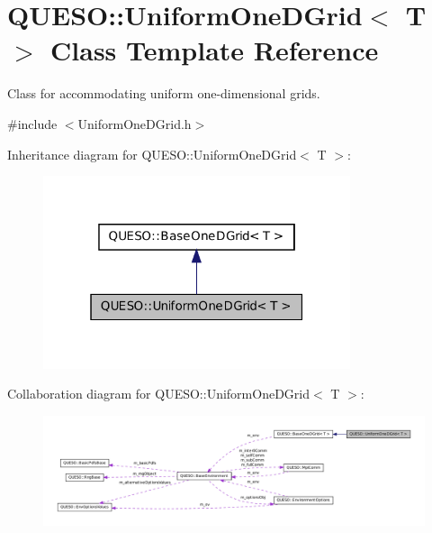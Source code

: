 \hypertarget{class_q_u_e_s_o_1_1_uniform_one_d_grid}{\section{Q\-U\-E\-S\-O\-:\-:Uniform\-One\-D\-Grid$<$ T $>$ Class Template Reference}
\label{class_q_u_e_s_o_1_1_uniform_one_d_grid}
}


Class for accommodating uniform one-\/dimensional grids.  




{\ttfamily \#include $<$Uniform\-One\-D\-Grid.\-h$>$}



Inheritance diagram for Q\-U\-E\-S\-O\-:\-:Uniform\-One\-D\-Grid$<$ T $>$\-:
\nopagebreak
\begin{figure}[H]
\begin{center}
\leavevmode
\includegraphics[width=256pt]{class_q_u_e_s_o_1_1_uniform_one_d_grid__inherit__graph}
\end{center}
\end{figure}


Collaboration diagram for Q\-U\-E\-S\-O\-:\-:Uniform\-One\-D\-Grid$<$ T $>$\-:
\nopagebreak
\begin{figure}[H]
\begin{center}
\leavevmode
\includegraphics[width=350pt]{class_q_u_e_s_o_1_1_uniform_one_d_grid__coll__graph}
\end{center}
\end{figure}
